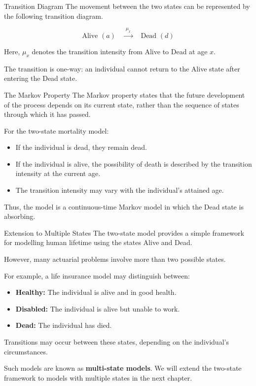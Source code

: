 \documentclass[
  ignorenonframetext,
  aspectratio=169,
]{beamer}
\providecommand{\tightlist}{%
  \setlength{\itemsep}{0pt}\setlength{\parskip}{0pt}}
\begin{document}
\begin{frame}{Transition Diagram}
\protect{}\label{transition-diagram}
The movement between the two states can be represented by the following
transition diagram.

\[
\boxed{\text{Alive }(a)}
\quad\xrightarrow{\ \mu_x\ }\quad
\boxed{\text{Dead }(d)}
\]

Here, \(\mu_x\) denotes the transition intensity from Alive to Dead at
age \(x\).

The transition is one-way: an individual cannot return to the Alive
state after entering the Dead state.
\end{frame}

\begin{frame}{The Markov Property}
\protect{}\label{the-markov-property}
The Markov property states that the future development of the process
depends on its current state, rather than the sequence of states through
which it has passed.

For the two-state mortality model:

\begin{itemize}
\tightlist
\item
  If the individual is dead, they remain dead.
\item
  If the individual is alive, the possibility of death is described by
  the transition intensity at the current age.
\item
  The transition intensity may vary with the individual's attained age.
\end{itemize}

Thus, the model is a continuous-time Markov model in which the Dead
state is absorbing.
\end{frame}

\begin{frame}{Extension to Multiple States}
\protect{}\label{extension-to-multiple-states}
The two-state model provides a simple framework for modelling human
lifetime using the states Alive and Dead.

However, many actuarial problems involve more than two possible states.

For example, a life insurance model may distinguish between:

\begin{itemize}
\tightlist
\item
  \textbf{Healthy:} The individual is alive and in good health.
\item
  \textbf{Disabled:} The individual is alive but unable to work.
\item
  \textbf{Dead:} The individual has died.
\end{itemize}

Transitions may occur between these states, depending on the
individual's circumstances.

Such models are known as \textbf{multi-state models}. We will extend the
two-state framework to models with multiple states in the next chapter.
\end{frame}
\end{document}
